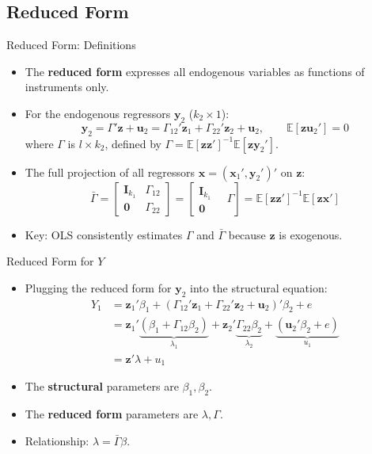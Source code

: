 \documentclass[aspectratio=169, handout]{beamer}
\numberwithin{equation}{section}
\begin{document}
\subsection{Reduced Form}

\begin{frame}{Reduced Form: Definitions}
\begin{itemize}
\item The \textbf{reduced form} expresses all endogenous variables as functions of instruments only.
\item For the endogenous regressors $\bm{y}_2$ ($k_2\times 1$):
$$\bm{y}_2 = \Gamma'\bm{z}+\bm{u}_2 = \Gamma_{12}'\bm{z}_1+\Gamma_{22}'\bm{z}_2+\bm{u}_2, \qquad \mathbb{E}[\bm{z}\bm{u}_2']=0$$
where $\Gamma$ is $l\times k_2$, defined by $\Gamma = \mathbb{E}[\bm{z}\bm{z}']^{-1}\mathbb{E}[\bm{z}\bm{y}_2']$.
\item The full projection of all regressors $\bm{x}=(\bm{x}_1', \bm{y}_2')'$ on $\bm{z}$:
$$\bar{\Gamma} = \begin{bmatrix} \bm{I}_{k_1} & \Gamma_{12}\\ \bm{0} & \Gamma_{22}\end{bmatrix} = \left[\begin{matrix} \bm{I}_{k_1}\\ \bm{0}\end{matrix}\quad \Gamma\right] = \mathbb{E}[\bm{z}\bm{z}']^{-1}\mathbb{E}[\bm{z}\bm{x}']$$
\item Key: OLS consistently estimates $\Gamma$ and $\bar{\Gamma}$ because $\bm{z}$ is exogenous.
\end{itemize}
\end{frame}


\begin{frame}{Reduced Form for $Y$}
\begin{itemize}
\item Plugging the reduced form for $\bm{y}_2$ into the structural equation:
\begin{align*}
Y_1 &= \bm{z}_1'\beta_1 + (\Gamma_{12}'\bm{z}_1 + \Gamma_{22}'\bm{z}_2+\bm{u}_2)'\beta_2 + e\\
&= \bm{z}_1'\underbrace{(\beta_1+\Gamma_{12}\beta_2)}_{\lambda_1} + \bm{z}_2'\underbrace{\Gamma_{22}\beta_2}_{\lambda_2} + \underbrace{(\bm{u}_2'\beta_2+e)}_{u_1}\\
&= \bm{z}'\lambda + u_1
\end{align*}
\item The \textbf{structural} parameters are $\beta_1, \beta_2$.
\item The \textbf{reduced form} parameters are $\lambda, \Gamma$.
\item Relationship: $\lambda = \bar{\Gamma}\beta$.
\end{itemize}
\end{frame}
\end{document}

